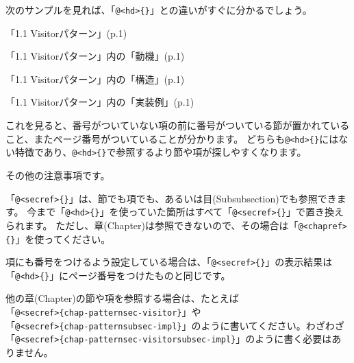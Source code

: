 次のサンプルを見れば、「\texttt{@}\texttt{\textless{}hd\textgreater{}\{\}}」との違いがすぐに分かるでしょう。

\begin{starterprogram}\end{starterprogram}
\noindent
{}

\starterresult

\begin{starteritemize}
\item 「1.1 Visitorパターン」(p.1)
\item 「1.1 Visitorパターン」内の「動機」(p.1)
\item 「1.1 Visitorパターン」内の「構造」(p.1)
\item 「1.1 Visitorパターン」内の「実装例」(p.1)
\end{starteritemize}

\endstarterresult

これを見ると、番号がついていない項の前に番号がついている節が置かれていること、またページ番号がついていることが分かります。
どちらも\texttt{@}\texttt{\textless{}hd\textgreater{}\{\}}にはない特徴であり、\texttt{@}\texttt{\textless{}hd\textgreater{}\{\}}で参照するより節や項が探しやすくなります。

その他の注意事項です。

\begin{starteritemize}
\item 「\texttt{@}\texttt{\textless{}secref\textgreater{}\{\}}」は、節でも項でも、あるいは目(Subsubsection)でも参照できます。
   今まで「\texttt{@}\texttt{\textless{}hd\textgreater{}\{\}}」を使っていた箇所はすべて「\texttt{@}\texttt{\textless{}secref\textgreater{}\{\}}」で置き換えられます。
   ただし、章(Chapter)は参照できないので、その場合は「\texttt{@}\texttt{\textless{}chapref\textgreater{}\{\}}」を使ってください。
\item 項にも番号をつけるよう設定している場合は、「\texttt{@}\texttt{\textless{}secref\textgreater{}\{\}}」の表示結果は「\texttt{@}\texttt{\textless{}hd\textgreater{}\{\}}」にページ番号をつけたものと同じです。
\item 他の章(Chapter)の節や項を参照する場合は、たとえば\\{}
  「\texttt{@}\texttt{\textless{}secref\textgreater{}\{chap{-}pattern\textbar{}sec{-}visitor\}}」や\\{}
  「\texttt{@}\texttt{\textless{}secref\textgreater{}\{chap{-}pattern\textbar{}subsec{-}impl\}}」のように書いてください。わざわざ\\{}
  「\texttt{@}\texttt{\textless{}secref\textgreater{}\{chap{-}pattern\textbar{}sec{-}visitor\textbar{}subsec{-}impl\}}」のように書く必要はありません。
\end{starteritemize}

